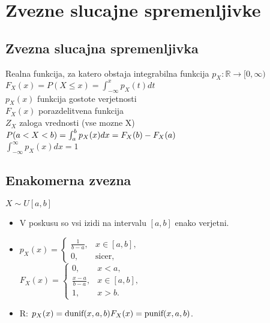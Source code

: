 \section{Zvezne slucajne spremenljivke}


\subsection{Zvezna slucajna spremenljivka}
Realna funkcija, za katero obstaja integrabilna funkcija $p_X:\mathbb{R}\rightarrow[0,\infty)$\\
$F_X(x)=P(X\leq x)=\int^x_{-\infty}p_X(t)dt$\\
$p_X(x)$ funkcija gostote verjetnosti\\
$F_X(x)$ porazdelitvena funkcija\\
$Z_X$ zaloga vrednosti (vse mozne X)\\
$P(a<X<b)=\int^b_a p_X(x)dx\\=F_X(b)-F_X(a)$\\
$\int^{\infty}_{-\infty}p_X(x)dx=1$\\


\subsection{Enakomerna zvezna}
$X\sim U[a,b]$
\begin{itemize}[leftmargin=*]
\item V poskusu so vsi izidi na intervalu $[a,b]$ enako verjetni.
\item $\displaystyle p_X(x)=
    \left\{\begin{array}{ll} 
    \tfrac{1}{b-a},  &	x\in [a,b],\\
    0,				&	\text{sicer},
    \end{array}\right.$\\
    $\displaystyle 	F_X(x)=
    \left\{\begin{array}{ll} 
    0,				&	x<a,\\
    \tfrac{x-a}{b-a},  &	x\in [a,b],\\
    1,				&	x>b.
    \end{array}\right.$
\item R: $p_X(x)=\text{dunif}(x,a,b)\\ F_X(x)=\text{punif}(x,a,b)$.
\end{itemize}
    


